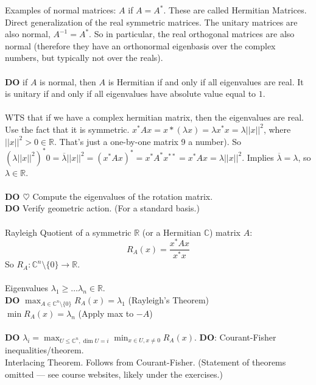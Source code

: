 \documentclass[12pt]{article}
\theoremstyle{remark}
\newcommand{\R}{\mathbb{R}}
\newcommand{\C}{\mathbb{C}}
\begin{document}
\begin{section}
Examples of normal matrices: $A$ if $A=A^*$. These are called Hermitian Matrices. Direct generalization of the real symmetric matrices. The unitary matrices are also normal, $A^{-1} = A^*$. So in particular, the real orthogonal matrices are also normal (therefore they have an orthonormal eigenbasis over the complex numbers, but typically not over the reals). 
\\\\
\textbf{DO} if $A$ is normal, then $A$ is Hermitian if and only if all eigenvalues are real. It is unitary if and only if all eigenvalues have absolute value equal to $1$.
\\\\
WTS that if we have a complex hermitian matrix, then the eigenvalues are real. Use the fact that it is symmetric. $x^* Ax = x*(\lambda x) = \lambda x^* x = \lambda ||x||^2$, where $||x||^2  >0 \in \R$. That's just a one-by-one matrix 9 a number). So $(\lambda ||x||^2)^*0 = \overline{\lambda}||x||^2 = (x^*Ax)^* = x^* A^* x^{**} = x^*Ax = \lambda ||x||^2$. Implies $\overline{\lambda} = \lambda$, so $\lambda \in \R$. 
\\\\
\textbf{DO $\heartsuit$} Compute the eigenvalues of the rotation matrix. 
\\\textbf{DO} Verify geometric action. (For a standard basis.) 
\\\\
Rayleigh Quotient of a symmetric $\R$ (or a Hermitian $\C$) matrix $A$: $$R_A(x) = \frac{x^*Ax}{x^*x}$$ So $R_A : \C^n \setminus \{0\} \to \R$.
\\\\
Eigenvalues $\lambda_1 \geq \ldots \lambda_n \in \R$.
\\
\textbf{DO} $\max_{A \in \C^n \setminus \{0\}} R_A(x) = \lambda_1$ (Rayleigh's Theorem)
\\ $\min R_A(x) = \lambda_n$ (Apply max to $-A$)
\\\\
\textbf{DO} $\lambda_i = \max_{U \leqslant \C^n, \dim U = i} \min_{x \in U, x \neq 0} R_A(x)$.
\textbf{DO}: Courant-Fisher inequalities/theorem. \\Interlacing Theorem. Follows from Courant-Fisher. (Statement of theorems omitted --- see course websites, likely under the exercises.) 
\end{section}
\newpage
\end{document}
